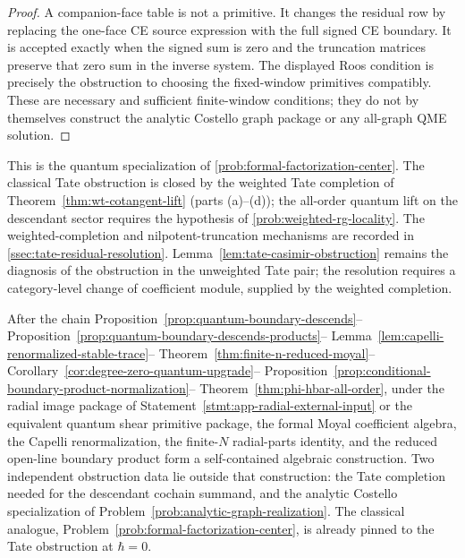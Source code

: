 \documentclass[11pt]{memoir}
\begin{document}
\begin{proof}
  A companion-face table is not a primitive.  It changes the residual
  row by replacing the one-face CE source expression with the full
  signed CE boundary.  It is accepted exactly when the signed sum is zero
  and the truncation matrices preserve that zero sum in the inverse
  system.  The displayed Roos condition is precisely the obstruction to
  choosing the fixed-window primitives compatibly.  These are necessary
  and sufficient finite-window conditions; they do not by themselves
  construct the analytic Costello graph package or any all-graph QME
  solution.
\end{proof}

\begin{prob}\label{prob:tate-coefficient-descendant-lift}
  This is the quantum specialization of
  \ref{prob:formal-factorization-center}. The classical Tate
  obstruction is closed by the weighted Tate completion of
  Theorem~\ref{thm:wt-cotangent-lift} (parts (a)--(d)); the all-order
  quantum lift on the descendant sector requires the hypothesis of
  \ref{prob:weighted-rg-locality}. The weighted-completion and
  nilpotent-truncation mechanisms are recorded in
  \ref{ssec:tate-residual-resolution}. Lemma~\ref{lem:tate-casimir-obstruction}
  remains the diagnosis of the obstruction in the unweighted Tate
  pair; the resolution requires a category-level change of
  coefficient module, supplied by the weighted completion.
\end{prob}

\begin{rmk}
  After the chain
  Proposition~\ref{prop:quantum-boundary-descends}--%
  Proposition~\ref{prop:quantum-boundary-descends-products}--%
  Lemma~\ref{lem:capelli-renormalized-stable-trace}--%
  Theorem~\ref{thm:finite-n-reduced-moyal}--%
  Corollary~\ref{cor:degree-zero-quantum-upgrade}--%
  Proposition~\ref{prop:conditional-boundary-product-normalization}--%
  Theorem~\ref{thm:phi-hbar-all-order}, under the radial image package
  of Statement~\ref{stmt:app-radial-external-input} or the equivalent
  quantum shear primitive package,
  the formal Moyal coefficient algebra, the Capelli renormalization, the
  finite-\(N\) radial-parts identity, and the reduced open-line boundary
  product form a self-contained algebraic construction. Two independent obstruction
  data lie outside that construction: the Tate completion needed for the
  descendant cochain summand, and the analytic Costello specialization of
  Problem~\ref{prob:analytic-graph-realization}. The classical analogue,
  Problem~\ref{prob:formal-factorization-center}, is already pinned to the
  Tate obstruction at $\hbar=0$.
\end{rmk}
\end{document}
